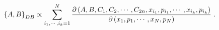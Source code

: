 \begin{equation}
\left\{  A,B\right\}  _{{\footnotesize DB}}\propto\sum_{i_{1},\cdots,i_{k}%
=1}^{N}\frac{\partial\left(  A,B,C_{1},C_{2},\cdots,C_{2n},x_{i_{1}},p_{i_{1}%
},\cdots,x_{i_{k}},p_{i_{k}}\right)  }{\partial\left(  x_{1},p_{1}%
,\cdots,x_{N},p_{N}\right)  }\;.
\end{equation}

